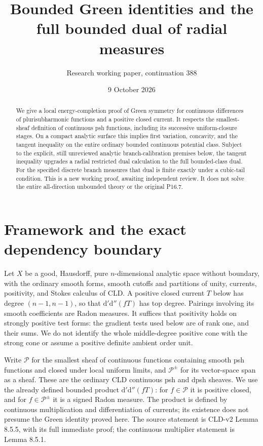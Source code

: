 \documentclass[11pt]{article}
\title{Bounded Green identities and the full bounded dual of radial measures}
\author{Research working paper, continuation 388}
\date{9 October 2026}
\newcommand{\dd}{\mathrm d'\mathrm d''}
\begin{document}
\maketitle
\begin{abstract}
We give a local energy-completion proof of Green symmetry for continuous
differences of plurisubharmonic functions and a positive closed current.
It respects the smallest-sheaf definition of continuous psh functions,
including its successive uniform-closure stages. On a compact analytic
surface this implies first variation, concavity, and the tangent inequality
on the entire ordinary bounded continuous potential class. Subject to the
explicit, still unreviewed analytic branch-calibration premises below,
the tangent inequality upgrades a radial restricted dual calculation to
the full bounded-class dual. For the specified discrete branch measures
that dual is finite exactly under a cubic-tail condition. This is a new
working proof, awaiting independent review. It does not solve the entire
all-direction unbounded theory or the original P16.7.
\end{abstract}

\section{Framework and the exact dependency boundary}
Let $X$ be a good, Hausdorff, pure $n$-dimensional analytic space without
boundary, with the ordinary smooth forms, smooth cutoffs and partitions
of unity, currents, positivity, and Stokes calculus of CLD. A positive
closed current $T$ below has degree $(n-1,n-1)$, so that $\dd(fT)$ has
top degree. Pairings involving its smooth coefficients are Radon
measures. It suffices that positivity holds on strongly positive test
forms: the gradient tests used below are of rank one, and their sums.
We do not identify the whole middle-degree positive cone with the
strong cone or assume a positive definite ambient order unit.

Write $\mathscr P$ for the smallest sheaf of continuous functions
containing smooth psh functions and closed under local uniform limits,
and $\mathscr P^{\pm}$ for its vector-space span as a sheaf. These are
the ordinary CLD continuous psh and dpsh sheaves. We use the already
defined bounded product $\dd(fT)$: for $f\in\mathscr P$ it is positive
closed, and for $f\in\mathscr P^{\pm}$ it is a signed Radon measure.
The product is defined by continuous multiplication and differentiation
of currents; its existence does not presume the Green identity proved
here. The source statement is CLD-v2 Lemma 8.5.5, with its full immediate
proof; the continuous multiplier statement is Lemma 8.5.1.
\end{document}
